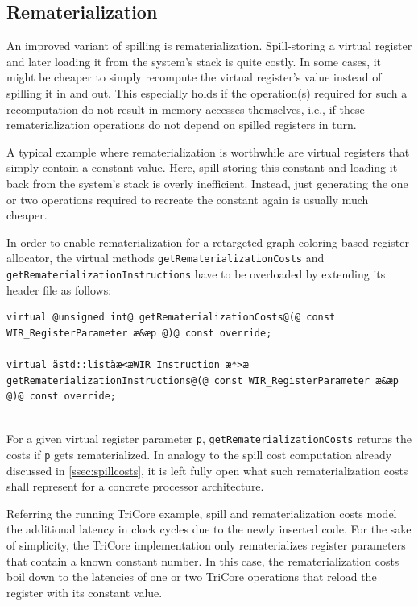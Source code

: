 \subsection{Rematerialization}
\label{ssec:rematerialization}

An improved variant of spilling is rematerialization.
Spill-storing a virtual register and later loading it from the system's stack is quite costly.
In some cases, it might be cheaper to simply recompute the virtual register's value instead of spilling it in and out.
This especially holds if the operation(s) required for such a recomputation do not result in memory accesses themselves, i.e., if these rematerialization operations do not depend on spilled registers in turn.

A typical example where rematerialization is worthwhile are virtual registers that simply contain a constant value.
Here, spill-storing this constant and loading it back from the system's stack is overly inefficient.
Instead, just generating the one or two operations required to recreate the constant again is usually much cheaper.

In order to enable rematerialization for a retargeted graph coloring-based register allocator, the virtual methods \texttt{getRematerializationCosts} and \texttt{getRematerializationInstructions} have to be overloaded by extending its header file as follows: \\
\begin{lstlisting}[style=code,float=!ht,aboveskip=-0.8 \baselineskip,belowskip=-0.8 \baselineskip]
virtual @unsigned int@ getRematerializationCosts@(@ const WIR_RegisterParameter æ&æp @)@ const override;

virtual ästd::listäæ<æWIR_Instruction æ*>æ getRematerializationInstructions@(@ const WIR_RegisterParameter æ&æp @)@ const override;
\end{lstlisting}
\\
For a given virtual register parameter \texttt{p}, \texttt{getRematerializationCosts} returns the costs if \texttt{p} gets rematerialized.
In analogy to the spill cost computation already discussed in \cref{ssec:spillcosts}, it is left fully open what such rematerialization costs shall represent for a concrete processor architecture.

Referring the running TriCore example, spill and rematerialization costs model the additional latency in clock cycles due to the newly inserted code.
For the sake of simplicity, the TriCore implementation only rematerializes register parameters that contain a known constant number.
In this case, the rematerialization costs boil down to the latencies of one or two TriCore operations that reload the register with its constant value.

